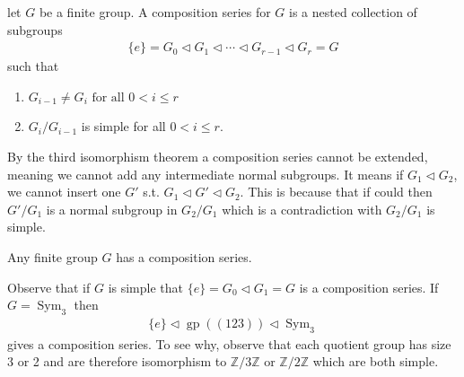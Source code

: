 \documentclass{article}
\newcommand{\gp}{\operatorname{gp}}
\newcommand{\Sym}{\operatorname{Sym}}
\begin{document}
\begin{defa}
  let $G$ be a finite group. A composition series for $G$ is a nested collection of subgroups
\begin{align*}
\{e\}=G_{0} \triangleleft G_{1} \triangleleft \cdots \triangleleft G_{r-1} \triangleleft G_{r}=G
\end{align*}
such that
\begin{enumerate}
    \item $G_{i-1} \neq G_{i} \text { for all } 0<i \leq r$
    \item $G_{i} / G_{i-1}$ is simple for all $0<i \leq r$.
\end{enumerate}
\end{defa}
\begin{rema}
By the third isomorphism theorem a composition series cannot be extended, meaning we cannot add any intermediate normal subgroups. It means if $ G_{1} \triangleleft G_2$, we cannot insert one $G'$ s.t. $G_{1} \triangleleft G'\triangleleft G_2$. This is because that if could then $G' / G_{1}$ is a normal subgroup in $G_2/G_1$ which is a contradiction with $G_2/G_1$ is simple.
\end{rema} 

\begin{thma}
 Any finite group $G$ has a composition series.
\end{thma} 
\begin{exma}
Observe that if $G$ is simple that $\{e\}=G_{0} \triangleleft G_{1}=G$ is a composition series. If $G=\Sym_{3}$ then
\begin{align*}
\{e\} \triangleleft \gp((123)) \triangleleft \Sym_{3}
\end{align*}
gives a composition series. To see why, observe that each quotient group has size 3 or 2 and are therefore isomorphism to $\mathbb{Z} / 3 \mathbb{Z}$ or $\mathbb{Z} / 2 \mathbb{Z}$ which are both simple.
\end{exma}
\end{document}
